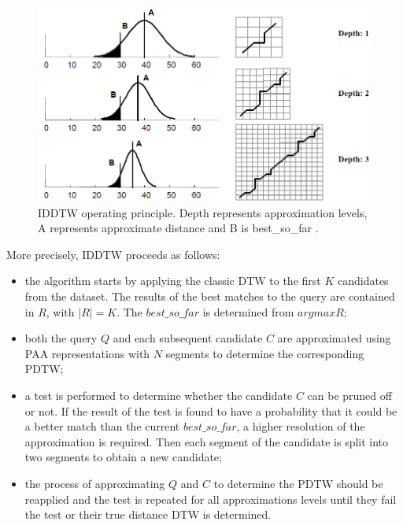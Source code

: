 \begin{figure}[h]
\center
\includegraphics[scale=0.4]{images/iddtw}
\caption{IDDTW operating principle. Depth represents approximation levels, A represents approximate distance and B is best\_so\_far \cite{chu2002iterative}. }

\label{iddtwPrinciple}

\end{figure}

More precisely, IDDTW proceeds as follows: 

\begin{itemize}
  \item the algorithm starts by applying the classic DTW  to the first $K$ candidates from the dataset. The results of the best matches to the query are contained in $R$, with $|R|=K$. The $best\_so\_far$ is determined from $argmax{R}$;

\item both the query $Q$ and each subsequent candidate $C$ are approximated using PAA representations with  $N$  segments to determine the corresponding PDTW;

\item a test is performed to determine whether the candidate $C$ can be pruned off or not. If the result of the test is found to have a
probability that it could be a better match than the current $best\_so\_far$, a higher resolution of the approximation is required. Then each segment of the candidate is split into two segments to obtain a new candidate;

\item the process of approximating $Q$ and $C$ to determine the PDTW
should be reapplied and the test is repeated for all approximations levels until they fail the test or their true distance DTW is determined.
\end{itemize}

